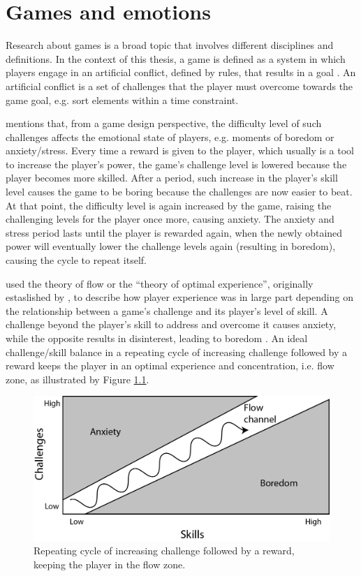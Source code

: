 \chapter{Games and emotions}
\label{ch:literature-games}

Research about games is a broad topic that involves different disciplines and definitions. In the context of this thesis, a game is defined as a system in which players engage in an artificial conflict, defined by rules, that results in a goal \parencite{salen2004rules}. An artificial conflict is a set of challenges that the player must overcome towards the game goal, e.g. sort elements within a time constraint.

\textcite{schell2014art} mentions that, from a game design perspective, the difficulty level of such challenges affects the emotional state of players, e.g. moments of boredom or anxiety/stress. Every time a reward is given to the player, which usually is a tool to increase the player's power, the game's challenge level is lowered because the player becomes more skilled. After a period, such increase in the player's skill level causes the game to be boring because the challenges are now easier to beat. At that point, the difficulty level is again increased by the game, raising the challenging levels for the player once more, causing anxiety. The anxiety and stress period lasts until the player is rewarded again, when the newly obtained power will eventually lower the challenge levels again (resulting in boredom), causing the cycle to repeat itself.

\textcite{chen2007flow} used the theory of flow or the ``theory of optimal experience'', originally estaslished by \textcite{csikszentmihalyi1991flow}, to describe how player experience was in large part depending on the relationship between a game's challenge and its player's level of skill. A challenge beyond the player's skill to address and overcome it causes anxiety, while the opposite results in disinterest, leading to boredom \parencite{chen2007flow}. An ideal challenge/skill balance in a repeating cycle of increasing challenge followed by a reward keeps the player in an optimal experience and concentration, i.e. flow zone, as illustrated by Figure \ref{fig:flow-schell}.

\begin{figure}[h!]
    \centering
    \includegraphics[scale=0.8]{Content/figures/flow-schell.png}
    \caption{Repeating cycle of increasing challenge followed by a reward, keeping the player in the flow zone. \parencite{schell2014art}}
    \label{fig:flow-schell}
\end{figure}


